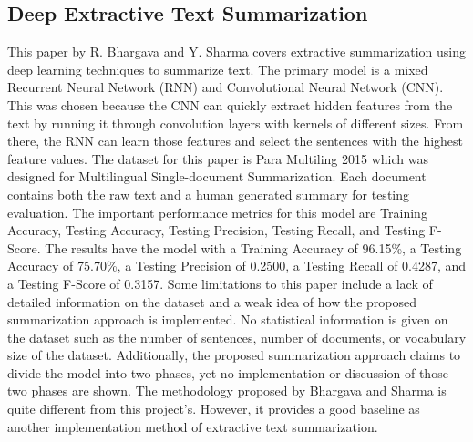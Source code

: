 \documentclass{IEEEtran}
\begin{document}
\subsection{Deep Extractive Text Summarization \cite{related_work_1}}
This paper by R. Bhargava and Y. Sharma covers extractive summarization using deep learning techniques to summarize text. The primary model is a mixed Recurrent Neural Network (RNN) and Convolutional Neural Network (CNN). This was chosen because the CNN can quickly extract hidden features from the text by running it through convolution layers with kernels of different sizes. From there, the RNN can learn those features and select the sentences with the highest feature values. The dataset for this paper is Para Multiling 2015 which was designed for Multilingual Single-document Summarization. Each document contains both the raw text and a human generated summary for testing evaluation. The important performance metrics for this model are Training Accuracy, Testing Accuracy, Testing Precision, Testing Recall, and Testing F-Score. The results have the model with a Training Accuracy of 96.15\%, a Testing Accuracy of 75.70\%, a Testing Precision of 0.2500, a Testing Recall of 0.4287, and a Testing F-Score of 0.3157. Some limitations to this paper include a lack of detailed information on the dataset and a weak idea of how the proposed summarization approach is implemented. No statistical information is given on the dataset such as the number of sentences, number of documents, or vocabulary size of the dataset. Additionally, the proposed summarization approach claims to divide the model into two phases, yet no implementation or discussion of those two phases are shown. The methodology proposed by Bhargava and Sharma is quite different from this project's. However, it provides a good baseline as another implementation method of extractive text summarization.
\end{document}
